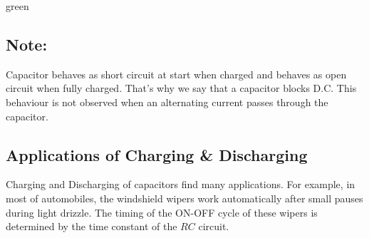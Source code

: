 \begin{mybox}{green}{}
\subsection*{\note{}Note:}
Capacitor behaves as short circuit at start when charged and behaves as open
circuit when fully charged. That's why we say that a capacitor blocks D.C.
This behaviour is not observed when an alternating current passes through the capacitor.  
\end{mybox}
\subsection*{Applications of Charging \& Discharging}
Charging and Discharging of capacitors find many applications. For example,
in most of automobiles, the windshield wipers work automatically after small
pauses during light drizzle. The timing of the ON-OFF cycle of these
wipers is determined by the time constant of the $RC$ circuit.
\newpage
